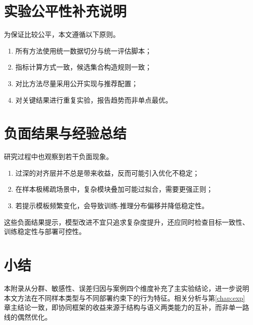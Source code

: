 \section{实验公平性补充说明}
为保证比较公平，本文遵循以下原则。
\begin{enumerate}
    \item 所有方法使用统一数据切分与统一评估脚本；
    \item 指标计算方式一致，候选集合构造规则一致；
    \item 对比方法尽量采用公开实现与推荐配置；
    \item 对关键结果进行重复实验，报告趋势而非单点最优。
\end{enumerate}

\section{负面结果与经验总结}
研究过程中也观察到若干负面现象。
\begin{enumerate}
    \item 过深的对齐层并不总是带来收益，反而可能引入优化不稳定；
    \item 在样本极稀疏场景中，复杂模块叠加可能过拟合，需要更强正则；
    \item 若提示模板频繁变化，会导致训练-推理分布偏移并降低稳定性。
\end{enumerate}
\par\indent 这些负面结果提示，模型改进不宜只追求复杂度提升，还应同时检查目标一致性、训练稳定性与部署可控性。

\section{小结}
本附录从分群、敏感性、误差归因与案例四个维度补充了主实验结论，进一步说明本文方法在不同样本类型与不同部署约束下的行为特征。相关分析与第\ref{chap:exp}章主结论一致，即协同框架的收益来源于结构与语义两类能力的互补，而非单一路线的偶然优化。
